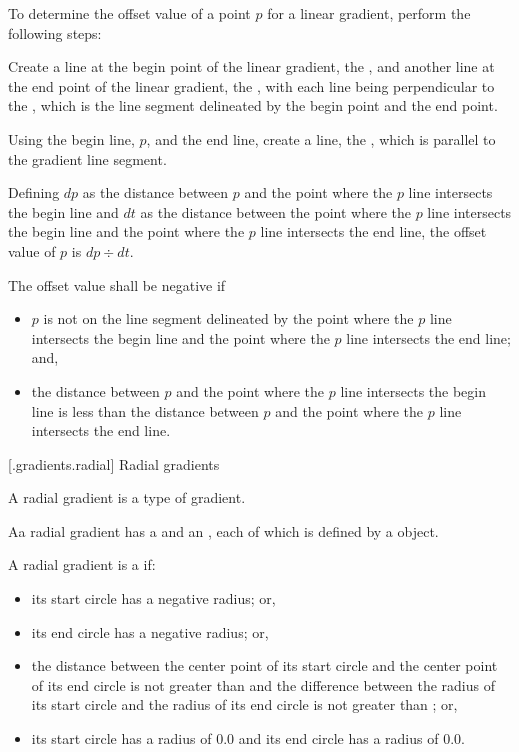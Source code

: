 \pnum
To determine the offset value of a point $p$ for a linear gradient, perform the following steps:
\begin{enumeratea}
\item Create a line at the begin point of the linear gradient, the , and another line at the end point of the linear gradient, the , with each line being perpendicular to the , which is the line segment delineated by the begin point and the end point.

\item Using the begin line, $p$, and the end line, create a line, the , which is parallel to the gradient line segment.

\item Defining $dp$ as the distance between $p$ and the point where the $p$ line intersects the begin line and $dt$ as the distance between the point where the $p$ line intersects the begin line and the point where the $p$ line intersects the end line, the offset value of $p$ is $dp \div dt$.

\item The offset value shall be negative if
\begin{itemize}
\item $p$ is not on the line segment delineated by the point where the $p$ line intersects the begin line and the point where the $p$ line intersects the end line; and,

\item the distance between $p$ and the point where the $p$ line intersects the begin line is less than the distance between $p$ and the point where the $p$ line intersects the end line.
\end{itemize}
\end{enumeratea}

 [\iotwod.gradients.radial] {Radial gradients}

\pnum
A radial gradient is a type of gradient.

\pnum
Aa radial gradient has a  and an , each of which is defined by a  object.

\pnum
A radial gradient is a  if:
\begin{itemize}
\item its start circle has a negative radius; or,
\item its end circle has a negative radius; or,
\item the distance between the center point of its start circle and the center point of its end circle is not greater than  and the difference between the radius of its start circle and the radius of its end circle is not greater than ; or,
\item its start circle has a radius of 0.0 and its end circle has a radius of 0.0.
\end{itemize}

